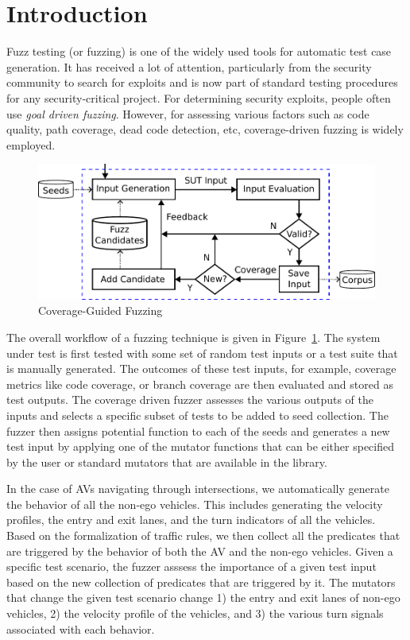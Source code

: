 \section{Introduction}

Fuzz testing (or fuzzing) is one of the widely used tools for automatic test case generation.
% 
It has received a lot of attention, particularly from the security community to search for exploits and is now part of standard testing procedures for any security-critical project.
% 
For determining security exploits, people often use \emph{goal driven fuzzing}.
% 
However, for assessing various factors such as code quality, path coverage, dead code detection, etc, coverage-driven fuzzing is widely employed.

\begin{figure}[t]
    \centering
    \includegraphics[width=0.9\linewidth]{figures/chapter5/Coverage-Guided Fuzzing.pdf}
    \caption{Coverage-Guided Fuzzing}
    \label{fig:fuzzing}
\end{figure}

The overall workflow of a fuzzing technique is given in Figure~\ref{fig:fuzzing}.
% 
The system under test is first tested with some set of random test inputs or a test suite that is manually generated.
% 
The outcomes of these test inputs, for example, coverage metrics like code coverage, or branch coverage are then evaluated and stored as test outputs.
% 
The coverage driven fuzzer assesses the various outputs of the inputs and selects a specific subset of tests to be added to seed collection.
% 
The fuzzer then assigns potential function to each of the seeds and generates a new test input by applying one of the mutator functions that can be either specified by the user or standard mutators that are available in the library.


In the case of AVs navigating through intersections, we automatically generate the behavior of all the non-ego vehicles.
% 
This includes generating the velocity profiles, the entry and exit lanes, and the turn indicators of all the vehicles.
% 
Based on the formalization of traffic rules, we then collect all the predicates that are triggered by the behavior of both the AV and the non-ego vehicles.
% 
Given a specific test scenario, the fuzzer asssess the importance of a given test input based on the new collection of predicates that are triggered by it.
% 
The mutators that change the given test scenario change 1) the entry and exit lanes of non-ego vehicles, 2) the velocity profile of the vehicles, and 3) the various turn signals associated with each behavior.
% 

